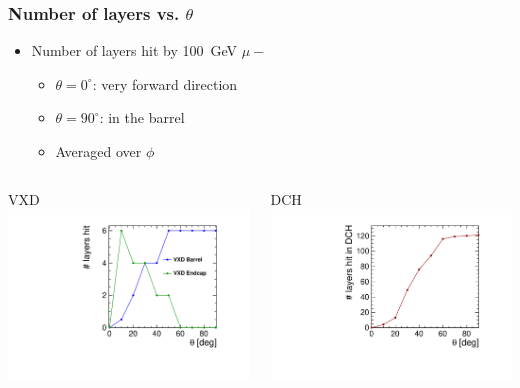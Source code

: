 \documentclass[hyperref={colorlinks=true,pdfpagelabels=false,linkcolor=black}, xcolor=dvipsnames,10pt]{beamer}
\begin{document}
\begin{frame}
	\frametitle{Number of layers vs. $\theta$}
	
	\begin{itemize}
		\item Number of layers hit by 100~GeV $\mu-$ 
		\begin{itemize}

		\item $\theta=0^{\circ}$: very forward direction
		\item $\theta=90^{\circ}$: in the barrel
		\item Averaged over $\phi$	
		\end{itemize}
	\end{itemize}
		
	\begin{columns}	
		\begin{block}{VXD}
		\centering
		\includegraphics[width=\textwidth]{../figures/theta_nbHits_VXD.pdf}
		\end{block}
	
		\begin{block}{DCH}
		\centering
		\includegraphics[width=\textwidth]{../figures/theta_nbHits_DCH.pdf} 	
		\end{block}
	\end{columns}
	
\end{frame}
\end{document}
